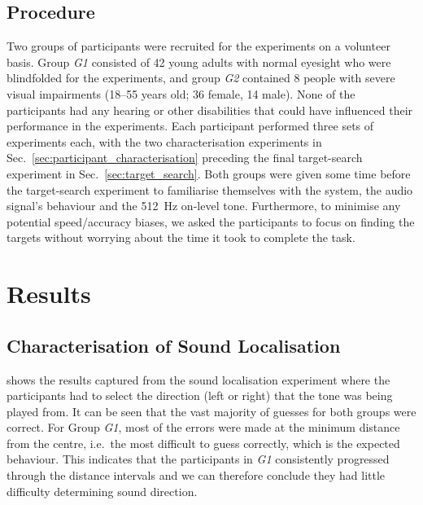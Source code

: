 \documentclass[]{interact}
\begin{document}

\subsection{Procedure}

Two groups of participants were recruited for the experiments on a volunteer basis. 
Group \textit{G1} consisted of 42 young adults with normal eyesight who were blindfolded for the experiments, and group \textit{G2} contained 8 people with severe visual impairments (18--55 years old; 36 female, 14 male). 
None of the participants had any hearing or other disabilities that could have influenced their performance in the experiments.
Each participant performed three sets of experiments each, with the two characterisation experiments in Sec.~\ref{sec:participant_characterisation} preceding the final target-search experiment in Sec.~\ref{sec:target_search}. 
Both groups were given some time before the target-search experiment to familiarise themselves with the system, the audio signal's behaviour and the \SI{512}{\hertz} on-level tone. 
Furthermore, to minimise any potential speed/accuracy biases, we asked the participants to focus on finding the targets without worrying about the time it took to complete the task. 

\section{Results}\label{sec:results}

\subsection{Characterisation of Sound Localisation}

 shows the results captured from the sound localisation experiment where the participants had to select the direction (left or right) that the tone was being played from. 
%
It can be seen that the vast majority of guesses for both groups were correct.
For Group \textit{G1}, most of the errors were made at the minimum distance from the centre, i.e.\ the most difficult to guess correctly, which is the expected behaviour.
This indicates that the participants in \textit{G1} consistently progressed through the distance intervals and we can therefore conclude they had little difficulty determining sound direction.
\end{document}
